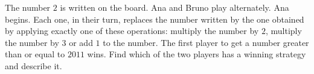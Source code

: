 The number $2$ is written on the board. Ana and Bruno play alternately. Ana begins. Each one, in their turn, replaces the number written by the one obtained by applying exactly one of these operations: multiply the number by $2$,  multiply the number by $3$ or add $1$ to the number. The first player to get a number greater than or equal to $2011$ wins. Find which of the two players has a winning strategy and describe it.